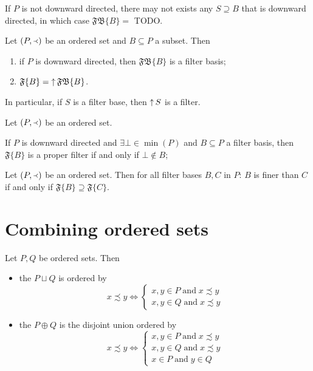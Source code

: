 If $P$ is not downward directed, there may not exists any $S \supseteq B$ that is downward directed, in which case $\mathfrak{FB}\{B\} =$ TODO.

\begin{proposition}
Let $\left( P,\Yleft \right)$ be an ordered set and $B\subseteq P$ a subset. Then
\begin{enumerate}
\item if $P$ is downward directed, then $\mathfrak{FB}\{B\}$ is a filter basis;
\item $\mathfrak{F}\{B\} = \mathop{\uparrow}\mathfrak{FB}\{B\}$.
\end{enumerate}
\end{proposition}
In particular, if $S$ is a filter base, then $\mathop{\uparrow} S$ is a filter.

\begin{lemma}
Let $\left( P,\Yleft \right)$ be an ordered set.

If $P$ is downward directed and $\exists \bot \in \min(P)$ and $B \subseteq P$ a filter basis, then $\mathfrak{F}\{B\}$ is a proper filter \textup{if and only if} $\bot \notin B$; 
\end{lemma}

\begin{proposition}
Let $\left( P,\Yleft \right)$ be an ordered set. Then for all filter bases $B,C$ in $P$: $B$ is finer than $C$ \textup{if and only if} $\mathfrak{F}\{B\} \supseteq \mathfrak{F}\{C\}$.
\end{proposition}


\section{Combining ordered sets}
\begin{definition}
Let $P,Q$ be ordered sets. Then
\begin{itemize}
\item the  $P\sqcup Q$ is ordered by
\[ x\precsim y \iff \begin{cases}
x,y\in P \;\text{and}\; x\precsim y \\
x,y\in Q \;\text{and}\; x\precsim y
\end{cases} \]
\item the  $P\oplus Q$ is the disjoint union ordered by
\[ x\precsim y \iff \begin{cases}
x,y\in P \;\text{and}\; x\precsim y \\
x,y\in Q \;\text{and}\; x\precsim y \\
x\in P \;\text{and}\; y\in Q
\end{cases} \]
\end{itemize}
\end{definition}

